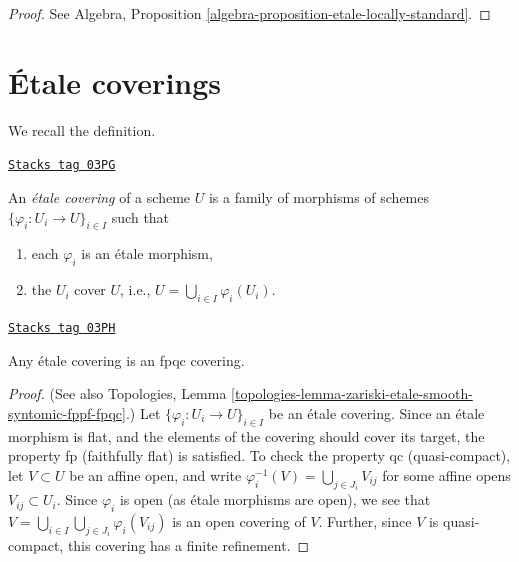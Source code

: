 \begin{proof}
See
Algebra, Proposition \ref{algebra-proposition-etale-locally-standard}.
\end{proof}

\section{\'Etale coverings}
\label{etale-cohomology-section-etale-covering}
We recall the definition.

\begin{definition}
\label{etale-cohomology-definition-etale-covering}
\href{https://stacks.math.columbia.edu/tag/03PG}{\texttt{Stacks tag 03PG}}

An {\it \'etale covering} of a scheme $U$ is a family of morphisms
of schemes
$\{\varphi_i : U_i \to U\}_{i \in I}$ such that
\begin{enumerate}
\item each $\varphi_i$ is an \'etale morphism,
\item the $U_i$ cover $U$, i.e., $U = \bigcup_{i\in I}\varphi_i(U_i)$.
\end{enumerate}
\end{definition}

\begin{lemma}
\label{etale-cohomology-lemma-etale-fpqc}
\href{https://stacks.math.columbia.edu/tag/03PH}{\texttt{Stacks tag 03PH}}

Any \'etale covering is an fpqc covering.
\end{lemma}

\begin{proof}
(See also
Topologies,
Lemma \ref{topologies-lemma-zariski-etale-smooth-syntomic-fppf-fpqc}.)
Let $\{\varphi_i : U_i \to U\}_{i \in I}$ be an \'etale covering.
Since an \'etale morphism is flat, and the elements of the covering should
cover its target, the property fp (faithfully flat) is satisfied.
To check the property qc (quasi-compact), let $V \subset U$ be an affine
open, and write $\varphi_i^{-1}(V) = \bigcup_{j \in J_i} V_{ij}$
for some affine opens $V_{ij} \subset U_i$. Since $\varphi_i$ is open
(as \'etale morphisms are open), we see that
$V = \bigcup_{i\in I} \bigcup_{j \in J_i} \varphi_i(V_{ij})$
is an open covering of $V$.
Further, since $V$ is quasi-compact, this covering has a finite
refinement.
\end{proof}

